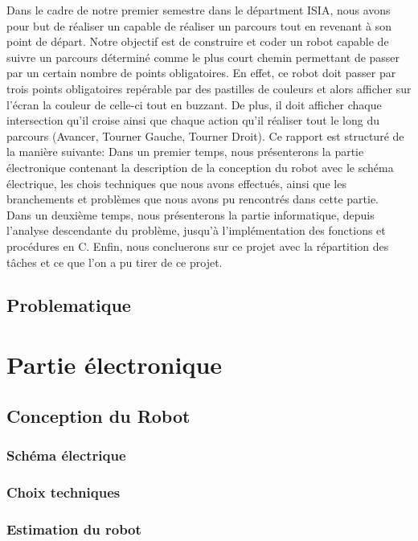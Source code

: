 \documentclass[11pt,a4paper]{article}
\begin{document}
Dans le cadre de notre premier semestre dans le départment ISIA, nous avons pour but de réaliser un  capable de réaliser un parcours tout en revenant à son point de départ.
Notre objectif est de construire et coder un robot capable de suivre un parcours déterminé comme le plus court chemin permettant de passer par un certain nombre de points obligatoires.
En effet, ce robot doit passer par trois points obligatoires repérable par des pastilles de couleurs et alors afficher sur l'écran la couleur de celle-ci tout en buzzant.
De plus, il doit afficher chaque intersection qu'il croise ainsi que chaque action qu'il réaliser tout le long du parcours (Avancer, Tourner Gauche, Tourner Droit).
Ce rapport est structuré de la manière suivante:
Dans un premier temps, nous présenterons la partie électronique contenant la description de la conception du robot avec le schéma électrique, les chois techniques que nous avons effectués, ainsi que les branchements et problèmes que nous avons pu rencontrés dans cette partie.\\
Dans un deuxième temps, nous présenterons la partie informatique, depuis l'analyse descendante du problème, jusqu'à l'implémentation des fonctions et procédures en C.
Enfin, nous concluerons sur ce projet avec la répartition des tâches et ce que l'on a pu tirer de ce projet.

\subsection{Problematique}


\section{Partie électronique}

\subsection{Conception du Robot}
\subsubsection{Schéma électrique}
\subsubsection{Choix techniques}
\subsubsection{Estimation du robot}
\end{document}
